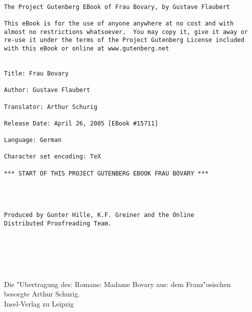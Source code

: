 \documentclass[oneside,12pt]{book}
\newenvironment{antiqua}{\normalfont}{}%
\newcommand{\s}{s:}%
\begin{document}
\thispagestyle{empty}

\begin{verbatim}

The Project Gutenberg EBook of Frau Bovary, by Gustave Flaubert

This eBook is for the use of anyone anywhere at no cost and with
almost no restrictions whatsoever.  You may copy it, give it away or
re-use it under the terms of the Project Gutenberg License included
with this eBook or online at www.gutenberg.net


Title: Frau Bovary

Author: Gustave Flaubert

Translator: Arthur Schurig

Release Date: April 26, 2005 [EBook #15711]

Language: German

Character set encoding: TeX

*** START OF THIS PROJECT GUTENBERG EBOOK FRAU BOVARY ***




Produced by Gunter Hille, K.F. Greiner and the Online
Distributed Proofreading Team.




\end{verbatim}


\newpage
\frakfamily

\thispagestyle{empty}

\bigskip\bigskip\bigskip\bigskip\bigskip\bigskip
\begin{center}
\Huge {}

\bigskip\bigskip\bigskip\bigskip\bigskip\bigskip
\large

 \\
\bigskip\bigskip\bigskip\bigskip
\Huge {} \\
\bigskip\bigskip\bigskip\bigskip\bigskip
\large
\vfill
Die "Ubertragung de{\s} Roman{\s} \begin{antiqua}Madame
Bovary\end{antiqua} au{\s} dem Franz"osischen besorgte Arthur
Schurig. \\ \bigskip\bigskip
Insel-Verlag zu Leipzig
\end{center}
\newpage
\thispagestyle{empty}


\begin{center}
\vspace{5cm}
{\Huge \so{Er{st}e{\s} Bu{ch}}}
\end{center}
\end{document}
